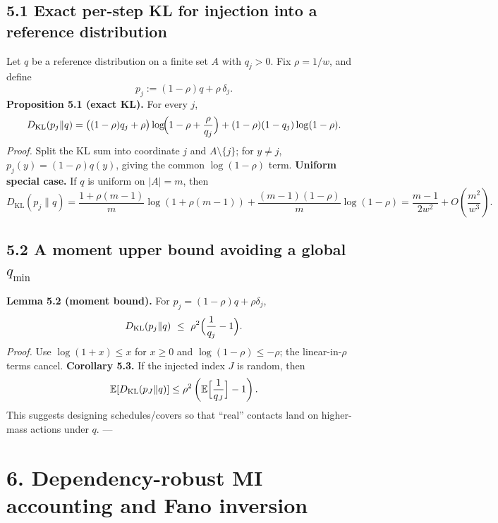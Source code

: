 \documentclass[11pt]{article}
\begin{document}
\hypertarget{exact-per-step-kl-for-injection-into-a-reference-distribution}{%
\subsection{5.1 Exact per-step KL for injection into a reference
distribution}\label{exact-per-step-kl-for-injection-into-a-reference-distribution}}

Let \(q\) be a reference distribution on a finite set \(A\) with
\(q_j>0\). Fix \(\rho=1/w\), and define \[
p_j:= (1-\rho)q + \rho\,\delta_j.
\] \textbf{Proposition 5.1 (exact KL).} For every \(j\), \[
D_{\mathrm{KL}}(p_j\|q)
= \big((1-\rho)q_j+\rho\big)\log\!\Bigl(1-\rho+\frac{\rho}{q_j}\Bigr)
+ (1-\rho)(1-q_j)\log(1-\rho).
\] \emph{Proof.} Split the KL sum into coordinate \(j\) and
\(A\setminus\{j\}\); for \(y\neq j\), \(p_j(y)=(1-\rho)q(y)\), giving
the common \(\log(1-\rho)\) term. \textbf{Uniform special case.} If
\(q\) is uniform on \(|A|=m\), then \[
D_{\mathrm{KL}}(p_j\|q)=\frac{1+\rho(m-1)}{m}\log(1+\rho(m-1))+\frac{(m-1)(1-\rho)}{m}\log(1-\rho)
=\frac{m-1}{2w^2}+O\!\left(\frac{m^2}{w^3}\right).
\]

\hypertarget{a-moment-upper-bound-avoiding-a-global-q_min}{%
\subsection{\texorpdfstring{5.2 A moment upper bound avoiding a global
\(q_{\min}\)}{5.2 A moment upper bound avoiding a global q\_\{\textbackslash min\}}}\label{a-moment-upper-bound-avoiding-a-global-q_min}}

\textbf{Lemma 5.2 (moment bound).} For \(p_j=(1-\rho)q+\rho\delta_j\),
\[
D_{\mathrm{KL}}(p_j\|q)\ \le\ \rho^2\Bigl(\frac{1}{q_j}-1\Bigr).
\] \emph{Proof.} Use \(\log(1+x)\le x\) for \(x\ge0\) and
\(\log(1-\rho)\le -\rho\); the linear-in-\(\rho\) terms cancel.
\textbf{Corollary 5.3.} If the injected index \(J\) is random, then \[
\mathbb{E}[D_{\mathrm{KL}}(p_J\|q)] \le \rho^2\left(\mathbb{E}\Bigl[\frac{1}{q_J}\Bigr]-1\right).
\] This suggests designing schedules/covers so that ``real'' contacts
land on higher-mass actions under \(q\). ---

\hypertarget{dependency-robust-mi-accounting-and-fano-inversion}{%
\section{6. Dependency-robust MI accounting and Fano
inversion}\label{dependency-robust-mi-accounting-and-fano-inversion}}
\end{document}
